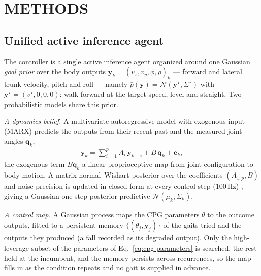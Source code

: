 \documentclass[letterpaper, 10 pt, conference]{ieeeconf}  %
\newcommand{\cN}{\mathcal{N}}
\begin{document}
\section{METHODS}
\label{sec:methods}


\subsection{Unified active inference agent}
\label{sec:agent}

The controller is a single active inference agent organized around one Gaussian \emph{goal prior} over the body outputs $\mathbf{y}_k = (v_x, v_y, \phi, \rho)_k$ --- forward and lateral trunk velocity, pitch and roll --- namely $\bar{p}(\mathbf{y}) = \cN(\mathbf{y}^{\star}, \Sigma^{\star})$ with $\mathbf{y}^{\star} = (v^{\star}, 0, 0, 0)$: walk forward at the target speed, level and straight. Two probabilistic models share this prior.

\emph{A dynamics belief.} A multivariate autoregressive model with exogenous input (MARX) predicts the outputs from their recent past and the measured joint angles $\mathbf{q}_k$,
\begin{align} \label{eq:marx}
    \mathbf{y}_k = \textstyle\sum_{i=1}^{p} A_i\, \mathbf{y}_{k-i} + B\, \mathbf{q}_k + \mathbf{e}_k ,
\end{align}
the exogenous term $B\mathbf{q}_k$ a linear proprioceptive map from joint configuration to body motion. A matrix-normal--Wishart posterior over the coefficients $(A_{1:p}, B)$ and noise precision is updated in closed form at every control step ($100$\,Hz) \cite{meera2026curvature}, giving a Gaussian one-step posterior predictive $\cN(\mu_k, \Sigma_k)$.

\emph{A control map.} A Gaussian process maps the CPG parameters $\theta$ to the outcome outputs, fitted to a persistent memory $\{(\theta_j, \mathbf{y}_j)\}$ of the gaits tried and the outputs they produced (a fall recorded as its degraded output). Only the high-leverage subset of the parameters of Eq.~\ref{eq:cpg-parameters} is searched, the rest held at the incumbent, and the memory persists across recurrences, so the map fills in as the condition repeats and no gait is supplied in advance.
\end{document}
